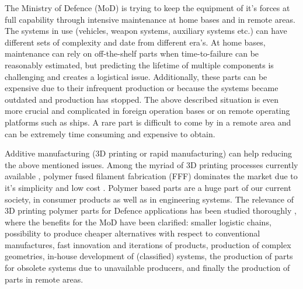 The Ministry of Defence (MoD) is trying to keep the equipment of it's forces at full capability through intensive maintenance at home bases and in remote areas. The systems in use (vehicles, weapon systems, auxiliary systems etc.) can have different sets of complexity and date from different era's. At home bases, maintenance can rely on off-the-shelf parts when time-to-failure can be reasonably estimated, but predicting the lifetime of multiple components is challenging and creates a logistical issue. Additionally, these parts can be expensive due to their infrequent production or because the systems became outdated and production has stopped. The above described situation is even more crucial and complicated in foreign operation bases or on remote operating platforms such as ships. A rare part is difficult to come by in a remote area and can be extremely time consuming and expensive to obtain. 


Additive manufacturing (3D printing or rapid manufacturing) can help reducing the above mentioned issues. Among the myriad of 3D printing processes currently available , polymer fused filament fabrication (FFF) dominates the market due to it's simplicity and low cost \cite{WohlersAssociates2017WohlersIndustry} . Polymer based parts are a huge part of our current society, in consumer products as well as in engineering systems. The relevance of 3D printing polymer parts for Defence applications has been studied thoroughly \cite{Bastiaans2015DeDefensie,NATOPerspectivesOperations,Joyce20143DDefense}, where the benefits for the MoD have been clarified: smaller logistic chains, possibility to produce cheaper alternatives with respect to conventional manufactures, fast innovation and iterations of products, production of complex geometries, in-house development of (classified) systems, the production of parts for obsolete systems due to unavailable producers, and finally the production of parts in remote areas.

